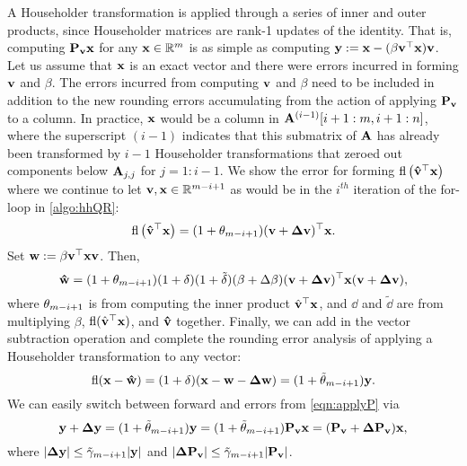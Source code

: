 A Householder transformation is applied through a series of inner and outer products, since Householder matrices are rank-1 updates of the identity. 
That is, computing  $\mathbf{P}_{\mathbf{v}}\mathbf{x}$ for any $\mathbf{x}\in\mathbb{R}^{m}$ is as simple as computing $\mathbf{y}:=\mathbf{x} - (\beta \mathbf{v}^{\top}\mathbf{x})\mathbf{v}$.
Let us assume that $\mathbf{x}$ is an exact vector and there were errors incurred in forming $\mathbf{v}$ and $\beta$. 
The errors incurred from computing $\mathbf{v}$ and $\beta$ need to be included in addition to the new rounding errors accumulating from the action of applying $\mathbf{P}_{\mathbf{v}}$ to a column.
In practice, $\mathbf{x}$ would be a column in $\mathbf{A}^{(i-1)}[i+1:m, i+1:n]$, where the superscript $(i-1)$ indicates that this submatrix of $\mathbf{A}$ has already been transformed by $i-1$ Householder transformations that zeroed out components below $\mathbf{A}_{j,j}$ for $j = 1:i-1$.
We show the error for forming $\mathrm{fl}\left(\mathbf{\hat{v}}^{\top}\mathbf{x}\right)$ where we continue to let $\mathbf{v},\mathbf{x}\in\mathbb{R}^{m-i+1}$ as would be in the $i^{th}$ iteration of the for-loop in \cref{algo:hhQR}:
\begin{equation*}
\mathrm{fl}\left(\mathbf{\hat{v}}^{\top}\mathbf{x}\right) = (1+\theta_{m-i+1})(\mathbf{v}+\mathbf{\Delta v})^{\top}\mathbf{x}.
\end{equation*}
Set $\mathbf{w}:=\beta\mathbf{v}^{\top}\mathbf{x}\mathbf{v}$.
Then,
\begin{equation*}
\mathbf{\hat{w}} =(1+\theta_{m-i+1})(1+\delta)(1+\tilde{\delta})(\beta+\Delta\beta)(\mathbf{v}+\mathbf{\Delta v})^{\top}\mathbf{x}(\mathbf{v}+\mathbf{\Delta v}),
\end{equation*}
where $\theta_{m-i+1}$ is from computing the inner product $\hat{\mathbf{v}}^{\top}\mathbf{x}$, and $\dd$ and $\tilde{\dd}$ are from multiplying $\beta$, $\mathrm{fl}(\hat{\mathbf{v}}^{\top}\mathbf{x})$, and $\mathbf{\hat{v}}$ together. 
Finally, we can add in the vector subtraction operation and complete the rounding error analysis of applying a Householder transformation to any vector:
\begin{equation}
\fl(\bb{x}-\bb{\hat{w}}) = (1+\dd)(\bb{x}-\bb{w}-\bb{\Delta w}) = (1+\tilde{\tth}_{m-i+1})\bb{y}.\label{eqn:applyP}
\end{equation}
We can easily switch between forward and errors from \cref{eqn:applyP} via
\begin{equation*}
	\mathbf{y}+\mathbf{\Delta y} = (1+\tilde{\theta}_{m-i+1})\mathbf{y} = (1+\tilde{\theta}_{m-i+1})\mathbf{P_vx} =  (\mathbf{P_v} +\mathbf{\Delta P_v})\mathbf{x},
\end{equation*}
where $|\mathbf{\Delta y}|\leq \tilde{\gamma}_{m-i+1}|\mathbf{y}|$ and  $|\mathbf{\Delta P_v}|\leq \tilde{\gamma}_{m-i+1}|\mathbf{P_v}|$.\par


